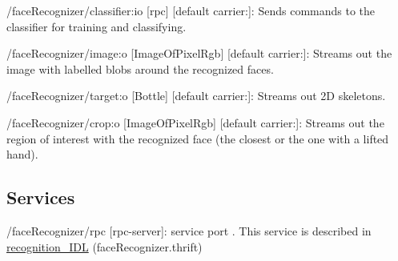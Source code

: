 \begin{DoxyItemize}
\item /face\+Recognizer/classifier\+:io \mbox{[}rpc\mbox{]} \mbox{[}default carrier\+:\mbox{]}\+: Sends commands to the classifier for training and classifying.
\item /face\+Recognizer/image\+:o \mbox{[}Image\+Of\+Pixel\+Rgb\mbox{]} \mbox{[}default carrier\+:\mbox{]}\+: Streams out the image with labelled blobs around the recognized faces.
\item /face\+Recognizer/target\+:o \mbox{[}Bottle\mbox{]} \mbox{[}default carrier\+:\mbox{]}\+: Streams out 2D skeletons.
\item /face\+Recognizer/crop\+:o \mbox{[}Image\+Of\+Pixel\+Rgb\mbox{]} \mbox{[}default carrier\+:\mbox{]}\+: Streams out the region of interest with the recognized face (the closest or the one with a lifted hand).
\end{DoxyItemize}\hypertarget{group__skeletonViewer_services_sec}{}\subsection{Services}\label{group__skeletonViewer_services_sec}

\begin{DoxyItemize}
\item /face\+Recognizer/rpc \mbox{[}rpc-\/server\mbox{]}\+: service port . This service is described in \hyperlink{classrecognition__IDL}{recognition\+\_\+\+I\+DL} (face\+Recognizer.\+thrift) 
\end{DoxyItemize}